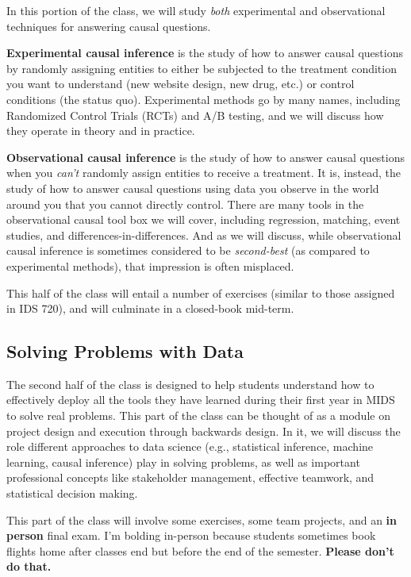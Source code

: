 \documentclass[12pt]{article}
\begin{document}
In this portion of the class, we will study \emph{both} experimental and observational techniques for answering causal questions. 

\textbf{Experimental causal inference} is the study of how to answer causal questions by randomly assigning entities to either be subjected to the treatment condition you want to understand (new website design, new drug, etc.) or control conditions (the status quo). Experimental methods go by many names, including Randomized Control Trials (RCTs) and A/B testing, and we will discuss how they operate in theory and in practice.

\textbf{Observational causal inference} is the study of how to answer causal questions when you \emph{can't} randomly assign entities to receive a treatment. It is, instead, the study of how to answer causal questions using data you observe in the world around you that you cannot directly control. There are many tools in the observational causal tool box we will cover, including regression, matching, event studies, and differences-in-differences. And as we will discuss, while observational causal inference is sometimes considered to be \emph{second-best} (as compared to experimental methods), that impression is often misplaced.

This half of the class will entail a number of exercises (similar to those assigned in IDS 720), and will culminate in a closed-book mid-term.

\subsection*{Solving Problems with Data}

The second half of the class is designed to help students understand how to effectively deploy all the tools they have learned during their first year in MIDS to solve real problems. This part of the class can be thought of as a module on project design and execution through backwards design. In it, we will discuss the role different approaches to data science (e.g., statistical inference, machine learning, causal inference) play in solving problems, as well as important professional concepts like stakeholder management, effective teamwork, and statistical decision making.

This part of the class will involve some exercises, some team projects, and an \textbf{in person} final exam. I'm bolding in-person because students sometimes book flights home after classes end but before the end of the semester. \textbf{Please don't do that.}
\end{document}
